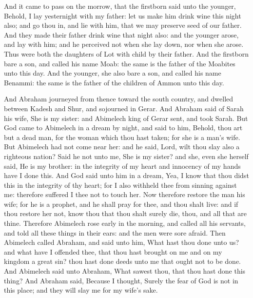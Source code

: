 \begin{biblechapter}
\verse And it came to pass on the morrow, that the firstborn said unto the younger, Behold, I lay yesternight with my father: let us make him drink wine this night also; and go thou in, and lie with him, that we may preserve seed of our father.
\verse And they made their father drink wine that night also: and the younger arose, and lay with him; and he perceived not when she lay down, nor when she arose.
\verse Thus were both the daughters of Lot with child by their father.
\verse And the firstborn bare a son, and called his name Moab: the same is the father of the Moabites unto this day.
\verse And the younger, she also bare a son, and called his name Benammi: the same is the father of the children of Ammon unto this day.
\end{biblechapter}

\begin{biblechapter} %
 And Abraham journeyed from thence toward the south country, and dwelled between Kadesh and Shur, and sojourned in Gerar.
\verse And Abraham said of Sarah his wife, She is my sister: and Abimelech king of Gerar sent, and took Sarah.
\verse But God came to Abimelech in a dream by night, and said to him, Behold, thou art but a dead man, for the woman which thou hast taken; for she is a man's wife.
\verse But Abimelech had not come near her: and he said, Lord, wilt thou slay also a righteous nation?
\verse Said he not unto me, She is my sister? and she, even she herself said, He is my brother: in the integrity of my heart and innocency of my hands have I done this.
\verse And God said unto him in a dream, Yea, I know that thou didst this in the integrity of thy heart; for I also withheld thee from sinning against me: therefore suffered I thee not to touch her.
\verse Now therefore restore the man his wife; for he is a prophet, and he shall pray for thee, and thou shalt live: and if thou restore her not, know thou that thou shalt surely die, thou, and all that are thine.
\verse Therefore Abimelech rose early in the morning, and called all his servants, and told all these things in their ears: and the men were sore afraid.
\verse Then Abimelech called Abraham, and said unto him, What hast thou done unto us? and what have I offended thee, that thou hast brought on me and on my kingdom a great sin? thou hast done deeds unto me that ought not to be done.
\verse And Abimelech said unto Abraham, What sawest thou, that thou hast done this thing?
\verse And Abraham said, Because I thought, Surely the fear of God is not in this place; and they will slay me for my wife's sake.

\end{biblechapter}
